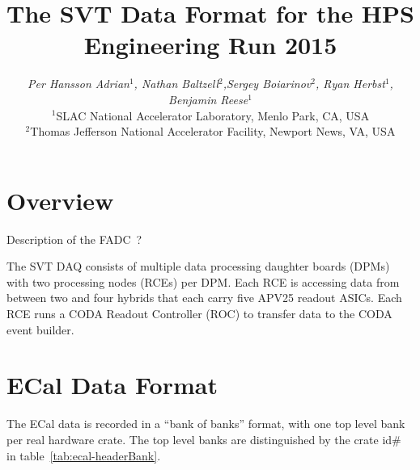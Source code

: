 \documentclass{desyproc}
\begin{document}
\title{The SVT Data Format for the HPS Engineering Run 2015 }

\author{{\slshape Per Hansson Adrian$^1$, Nathan Baltzell$^2$,Sergey Boiarinov$^2$, Ryan Herbst$^1$, Benjamin Reese$^1$}\\
$^1$SLAC National Accelerator Laboratory, Menlo Park, CA, USA\\
$^2$Thomas Jefferson National Accelerator Facility, Newport News, VA, USA}



\maketitle







\section{Overview}

Description of the FADC~\cite{fadc250}?

The SVT DAQ consists of multiple data processing daughter boards (DPMs) with two processing nodes (RCEs) per DPM. 
Each RCE is accessing data from between two and four hybrids that each carry five APV25 readout ASICs. Each RCE 
runs a CODA Readout Controller  (ROC) to transfer data to the CODA event builder. 

\section{ECal Data Format}
The ECal data is recorded in a ``bank of banks'' format, with one top level bank per real hardware crate.  The top level banks are distinguished by the crate id\# in table~\ref{tab:ecal-headerBank}.
\end{document}
